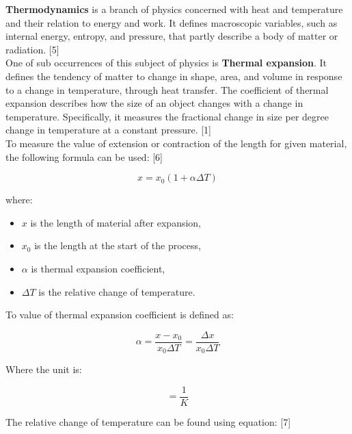 \documentclass[a4paper]{article}
\begin{document}
\textbf{Thermodynamics} is a branch of physics concerned with heat and temperature and their relation to energy and work. It defines macroscopic variables, such as internal energy, entropy, and pressure, that partly describe a body of matter or radiation. [5]\\

One of sub occurrences of this subject of physics is \textbf{Thermal expansion}. It defines the tendency of matter to change in shape, area, and volume in response to a change in temperature, through heat transfer. The coefficient of thermal expansion describes how the size of an object changes with a change in temperature. Specifically, it measures the fractional change in size per degree change in temperature at a constant pressure. [1]\\

To measure the value of extension or contraction of the length for given material, the following formula can be used: [6]

\clearpage

\begin{equation}
x = x_{0} (1 + \alpha \Delta T)
\end{equation}

where:
\begin{itemize}
	\setlength{\itemsep}{1pt}
	\setlength{\parskip}{0pt}
	\setlength{\parsep}{0pt}
\item $x$ is the length of material after expansion,
\item $x_{0}$ is the length at the start of the process,
\item $\alpha$ is thermal expansion coefficient,
\item $\Delta T$ is the relative change of temperature.\\
\end{itemize}

To value of thermal expansion coefficient is defined as: 

\begin{equation}
\alpha = \frac {x - x_{0}} {x_{0} \Delta T} = \frac {\Delta x} {x_{0} \Delta T}
\end{equation}

Where the unit is:

\begin{equation}
[\alpha] = \frac {1}{K}
\end{equation}

The relative change of temperature can be found using equation: [7]
\end{document}

